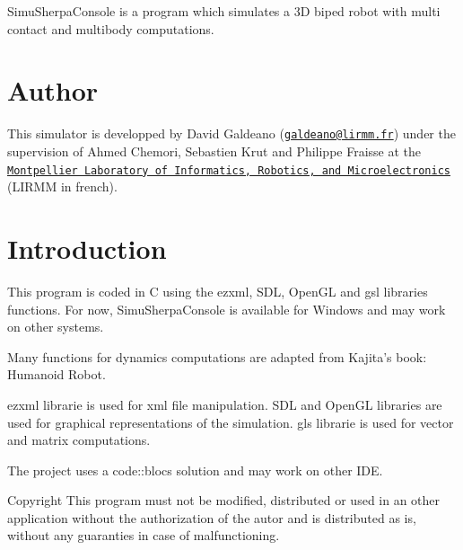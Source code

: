 Simu\-Sherpa\-Console is a program which simulates a 3\-D biped robot with multi contact and multibody computations.\hypertarget{index_author_sec}{}\section{Author}\label{index_author_sec}
This simulator is developped by David Galdeano (\href{mailto:galdeano@lirmm.fr}{\tt galdeano@lirmm.\-fr}) under the supervision of Ahmed Chemori, Sebastien Krut and Philippe Fraisse at the \href{http://www.lirmm.fr}{\tt Montpellier Laboratory of Informatics, Robotics, and Microelectronics} (L\-I\-R\-M\-M in french).\hypertarget{index_intro_sec}{}\section{Introduction}\label{index_intro_sec}
This program is coded in C using the ezxml, S\-D\-L, Open\-G\-L and gsl libraries functions. For now, Simu\-Sherpa\-Console is available for Windows and may work on other systems.

Many functions for dynamics computations are adapted from Kajita's book\-: Humanoid Robot.

ezxml librarie is used for xml file manipulation. S\-D\-L and Open\-G\-L libraries are used for graphical representations of the simulation. gls librarie is used for vector and matrix computations.

The project uses a code\-::blocs solution and may work on other I\-D\-E.

\begin{DoxyCopyright}{Copyright}
This program must not be modified, distributed or used in an other application without the authorization of the autor and is distributed as is, without any guaranties in case of malfunctioning. 
\end{DoxyCopyright}
